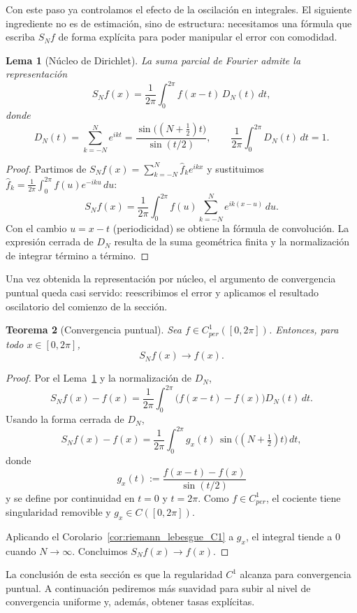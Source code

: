 \documentclass[a4paper,11pt]{report}
\newtheorem{theorem}{Teorema}[chapter]
\newtheorem{lemma}[theorem]{Lema}
\begin{document}
Con este paso ya controlamos el efecto de la oscilaci\'on en integrales. El siguiente ingrediente no es de estimaci\'on, sino de estructura: necesitamos una f\'ormula que escriba $S_N f$ de forma expl\'icita para poder manipular el error con comodidad.

\begin{lemma}[Núcleo de Dirichlet]\label{lem:dirichlet_kernel}
La suma parcial de Fourier admite la representación
\[
S_N f(x)=\frac{1}{2\pi}\int_0^{2\pi} f(x-t)\,D_N(t)\,dt,
\]
donde
\[
D_N(t)=\sum_{k=-N}^{N}e^{ikt}=\frac{\sin\!\big((N+\tfrac12)t\big)}{\sin(t/2)},
\qquad
\frac{1}{2\pi}\int_0^{2\pi}D_N(t)\,dt=1.
\]
\end{lemma}

\begin{proof}
Partimos de $S_N f(x)=\sum_{k=-N}^{N}\hat f_k e^{ikx}$ y sustituimos
$\hat f_k=\frac{1}{2\pi}\int_0^{2\pi}f(u)e^{-iku}\,du$:
\[
S_N f(x)=\frac{1}{2\pi}\int_0^{2\pi} f(u)\sum_{k=-N}^{N}e^{ik(x-u)}\,du.
\]
Con el cambio $u=x-t$ (periodicidad) se obtiene la fórmula de convolución. La expresión cerrada de $D_N$ resulta de la suma geométrica finita y la normalización de integrar término a término.
\end{proof}

Una vez obtenida la representaci\'on por n\'ucleo, el argumento de convergencia puntual queda casi servido: reescribimos el error y aplicamos el resultado oscilatorio del comienzo de la secci\'on.

\begin{theorem}[Convergencia puntual]\label{thm:conv_C1}
Sea $f\in C^1_{per}([0,2\pi])$. Entonces, para todo $x\in[0,2\pi]$,
\[
S_N f(x)\to f(x).
\]
\end{theorem}

\begin{proof}
Por el Lema~\ref{lem:dirichlet_kernel} y la normalización de $D_N$,
\[
S_N f(x)-f(x)=\frac{1}{2\pi}\int_0^{2\pi}\big(f(x-t)-f(x)\big)D_N(t)\,dt.
\]
Usando la forma cerrada de $D_N$,
\[
S_N f(x)-f(x)=\frac{1}{2\pi}\int_0^{2\pi} g_x(t)\,\sin\!\big((N+\tfrac12)t\big)\,dt,
\]
donde
\[
g_x(t):=\frac{f(x-t)-f(x)}{\sin(t/2)}
\]
y se define por continuidad en $t=0$ y $t=2\pi$. Como $f\in C^1_{per}$, el cociente tiene singularidad removible y $g_x\in C([0,2\pi])$.

Aplicando el Corolario~\ref{cor:riemann_lebesgue_C1} a $g_x$, el integral tiende a $0$ cuando $N\to\infty$. Concluimos $S_N f(x)\to f(x)$.
\end{proof}

La conclusi\'on de esta secci\'on es que la regularidad $C^1$ alcanza para convergencia puntual. A continuaci\'on pediremos m\'as suavidad para subir al nivel de convergencia uniforme y, adem\'as, obtener tasas expl\'icitas.
\end{document}
